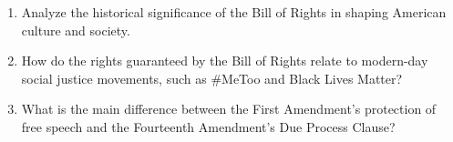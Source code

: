 \documentclass{article}
\begin{document}
\begin{enumerate}
\vspace{2cm} \item Analyze the historical significance of the Bill of Rights in shaping American culture and society. \vspace{2cm} \item How do the rights guaranteed by the Bill of Rights relate to modern-day social justice movements, such as #MeToo and Black Lives Matter? \vspace{2cm} \item What is the main difference between the First Amendment's protection of free speech and the Fourteenth Amendment's Due Process Clause? \vspace{2cm}
\end{enumerate}
\end{document}
